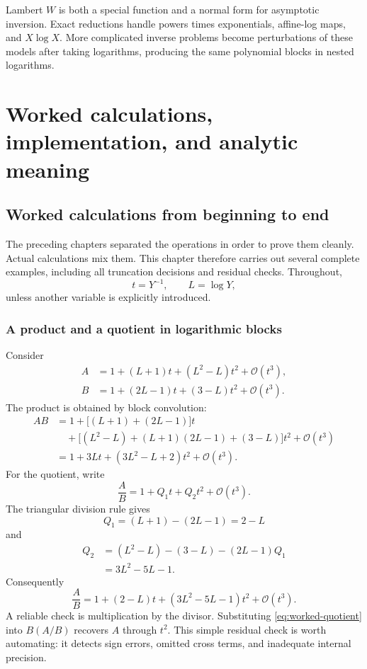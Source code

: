 \documentclass[11pt,oneside]{book}
\theoremstyle{definition}
\theoremstyle{remark}
\newcommand{\bigO}{\mathcal O}
\begin{document}
\begin{summarybox}
Lambert $W$ is both a special function and a normal form for asymptotic
inversion.  Exact reductions handle powers times exponentials, affine-log
maps, and $X\log X$.  More complicated inverse problems become perturbations
of these models after taking logarithms, producing the same polynomial blocks
in nested logarithms.
\end{summarybox}


\part{Worked calculations, implementation, and analytic meaning}
\label{part:practice}

\chapter{Worked calculations from beginning to end}
\label{ch:worked-calculations}

The preceding chapters separated the operations in order to prove them
cleanly. Actual calculations mix them. This chapter therefore carries out
several complete examples, including all truncation decisions and residual
checks. Throughout,
\[
 t=Y^{-1},\qquad L=\log Y,
\]
unless another variable is explicitly introduced.

\section{A product and a quotient in logarithmic blocks}
Consider
\begin{align*}
 A&=1+(L+1)t+(L^2-L)t^2+\bigO(t^3),\\
 B&=1+(2L-1)t+(3-L)t^2+\bigO(t^3).
\end{align*}
The product is obtained by block convolution:
\begin{align*}
 AB
 &=1+\bigl[(L+1)+(2L-1)\bigr]t\\
 &\quad+\bigl[(L^2-L)+(L+1)(2L-1)+(3-L)\bigr]t^2
   +\bigO(t^3)\\
 &=1+3Lt+(3L^2-L+2)t^2+\bigO(t^3).
\end{align*}
For the quotient, write
\[
 \frac AB=1+Q_1t+Q_2t^2+\bigO(t^3).
\]
The triangular division rule gives
\[
 Q_1=(L+1)-(2L-1)=2-L
\]
and
\begin{align*}
 Q_2
 &=(L^2-L)-(3-L)-(2L-1)Q_1\\
 &=3L^2-5L-1.
\end{align*}
Consequently
\begin{equation}\label{eq:worked-quotient}
 \frac AB
 =1+(2-L)t+(3L^2-5L-1)t^2+\bigO(t^3).
\end{equation}
A reliable check is multiplication by the divisor. Substituting
\eqref{eq:worked-quotient} into $B(A/B)$ recovers $A$ through $t^2$. This
simple residual check is worth automating: it detects sign errors, omitted
cross terms, and inadequate internal precision.
\end{document}
